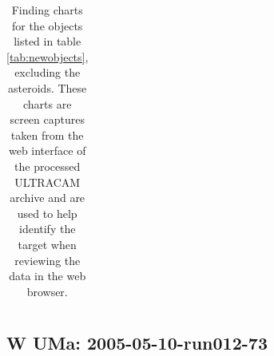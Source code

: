 \begin{table}
\begin{tabular}{ccc}
   \\
  \end{tabular}
  \caption{Finding charts for the objects listed in table \ref{tab:newobjects}, excluding the asteroids. These charts are screen captures taken from the web interface of the processed ULTRACAM archive and are used to help identify the target when reviewing the data in the web browser.}
  \label{tab:findingcharts}
\end{table}

\newpage

\subsection{{W UMa}: 2005-05-10-run012-73}
  
